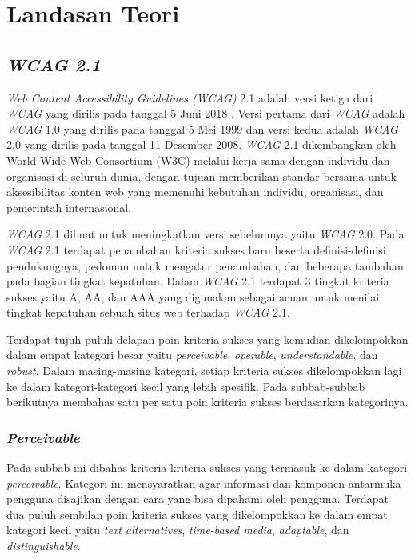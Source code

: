 \setcounter{secnumdepth}{3}

\chapter{Landasan Teori}
\label{chap:teori}

\section{\textit{WCAG 2.1}}
\label{sec:wcag_2.1} 
\textit{Web Content Accessibility Guidelines (WCAG)} 2.1 adalah versi ketiga dari \textit{WCAG} yang dirilis pada tanggal 5 Juni 2018 \cite{WCAG:2.1}. Versi pertama dari \textit{WCAG} adalah \textit{WCAG} 1.0 yang dirilis pada tanggal 5 Mei 1999 dan versi kedua adalah \textit{WCAG} 2.0 yang dirilis pada tanggal 11 Desember 2008. \textit{WCAG} 2.1 dikembangkan oleh World Wide Web Consortium (W3C) melalui kerja sama dengan individu dan organisasi di seluruh dunia, dengan tujuan memberikan standar bersama untuk aksesibilitas konten web yang memenuhi kebutuhan individu, organisasi, dan pemerintah internasional. 

\textit{WCAG} 2.1 dibuat untuk meningkatkan versi sebelumnya yaitu \textit{WCAG} 2.0. Pada \textit{WCAG} 2.1 terdapat penambahan kriteria sukses baru beserta definisi-definisi pendukungnya, pedoman untuk mengatur penambahan, dan beberapa tambahan pada bagian tingkat kepatuhan. Dalam \textit{WCAG} 2.1 terdapat 3 tingkat kriteria sukses yaitu A, AA, dan AAA yang digunakan sebagai acuan untuk menilai tingkat kepatuhan sebuah situs web terhadap \textit{WCAG} 2.1.

Terdapat tujuh puluh delapan poin kriteria sukses yang kemudian dikelompokkan dalam empat kategori besar yaitu \textit{perceivable}, \textit{operable}, \textit{understandable}, dan \textit{robust}. Dalam masing-masing kategori, setiap kriteria sukses dikelompokkan lagi ke dalam kategori-kategori kecil yang lebih spesifik. Pada subbab-subbab berikutnya membahas satu per satu poin kriteria sukses berdasarkan kategorinya.

\subsection{\textit{Perceivable}}
\label{sec:perceivable}
Pada subbab ini dibahas kriteria-kriteria sukses yang termasuk ke dalam kategori \textit{perceivable}. Kategori ini mensyaratkan agar informasi dan komponen antarmuka pengguna disajikan dengan cara yang bisa dipahami oleh pengguna. Terdapat dua puluh sembilan poin kriteria sukses yang dikelompokkan ke dalam empat kategori kecil yaitu \textit{text alternatives}, \textit{time-based media}, \textit{adaptable}, dan \textit{distinguishable}.

